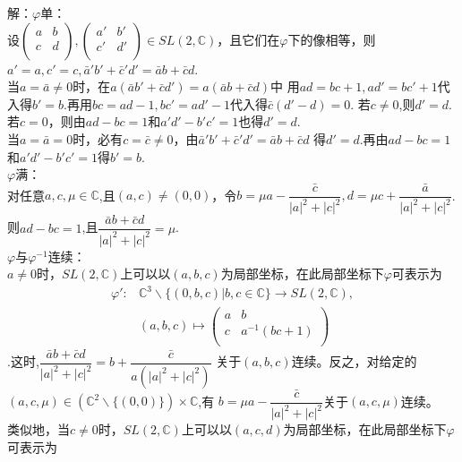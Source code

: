 \begin{enumerate}
    解：$\varphi$单：\\
    \quad 设$\begin{pmatrix}
        a & b\\
        c & d\\
    \end{pmatrix},
    \begin{pmatrix}
        a' & b'\\
        c' & d'\\
    \end{pmatrix}\in SL(2,\mathbb{C})$，且它们在$\varphi$下的像相等，则
    $a'=a, c'=c, \bar{a}'b'+\bar{c}'d'=\bar{a}b+\bar{c}d$.\\
    \quad 当$a=\bar{a}\neq 0$时，在$a(\bar{a}b'+\bar{c}d')=a(\bar{a}b+\bar{c}d)$中
    用$ad=bc+1,ad'=bc'+1$代入得$b'=b$.再用$bc=ad-1,bc'=ad'-1$代入得$\bar{c}(d'-d)=0$.
    若$c\neq0$,则$d'=d$.若$c=0$，则由$ad-bc=1$和$a'd'-b'c'=1$也得$d'=d$.\\
    \quad 当$a=\bar{a}=0$时，必有$c=\bar{c}\neq0$，由$\bar{a}'b'+\bar{c}'d'=\bar{a}b+\bar{c}d$
    得$d'=d$.再由$ad-bc=1$和$a'd'-b'c'=1$得$b'=b$.\\
    \quad $\varphi$满：\\
    \quad 对任意$a,c,\mu \in \mathbb{C}$,且$(a,c)\neq(0,0)$，令$b=\mu a-\dfrac{\bar{c}}{|a|^2+|c|^2},
    d=\mu c+\dfrac{\bar{a}}{|a|^2+|c|^2}$.则$ad-bc=1$,且$\dfrac{\bar{a}b+\bar{c}d}{|a|^2+|c|^2}=\mu$.\\
    \quad $\varphi$与$\varphi^{-1}$连续：\\
    \quad $a\neq 0时，SL(2, \mathbb{C})$上可以以$(a,b,c)$为局部坐标，在此局部坐标下$\varphi$可表示为
    \begin{align*}
        \varphi':&\mathbb{C}^3\backslash\{(0,b,c)|b,c\in \mathbb{C}\}\rightarrow SL(2,\mathbb{C}),\\
        &(a,b,c)\mapsto 
        \begin{pmatrix}
            a & b\\
            c & a^{-1}(bc+1)\\
        \end{pmatrix}
    \end{align*}.这时,$\dfrac{\bar{a}b+\bar{c}d}{|a|^2+|c|^2}=b+\dfrac{\bar{c}}{a(|a|^2+|c|^2)}$
    关于$(a,b,c)$连续。反之，对给定的$(a,c,\mu)\in (\mathbb{C}^2\backslash\{(0,0)\})\times\mathbb{C}$,有
    $b=\mu a-\dfrac{\bar{c}}{|a|^2+|c|^2}$关于$(a,c,\mu)$连续。\\
    \quad 类似地，当$c\neq 0$时，$SL(2,\mathbb{C})$上可以以$(a,c,d)$为局部坐标，在此局部坐标下$\varphi$可表示为

\end{enumerate}
